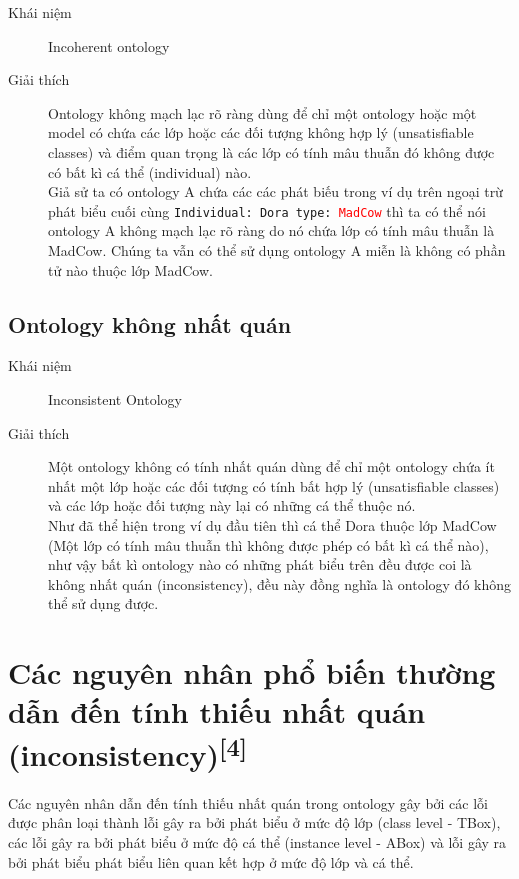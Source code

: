 \begin{description}

\item[Khái niệm] Incoherent ontology

\item[Giải thích]
Ontology không mạch lạc rõ ràng dùng để chỉ một ontology hoặc một model có chứa các lớp hoặc các đối tượng không hợp lý (unsatisfiable classes) và điểm quan trọng là các lớp có tính mâu thuẫn đó không được có bất kì cá thể (individual) nào.
\\
Giả sử ta có ontology A chứa các các phát biếu trong ví dụ trên ngoại trừ phát biểu cuối cùng \texttt{Individual: Dora type: \textcolor{red}{MadCow}} thì ta có thể nói ontology A không mạch lạc rõ ràng do nó chứa lớp có tính mâu thuẫn là MadCow. Chúng ta vẫn có thể sử dụng ontology A miễn là không có phần tử nào thuộc lớp MadCow.
\end{description}

\subsection{Ontology không nhất quán}
\begin{description}
\item[Khái niệm] Inconsistent Ontology
\item[Giải thích] 
Một ontology không có tính nhất quán dùng để chỉ một ontology chứa ít nhất một lớp hoặc các đối tượng có tính bất hợp lý (unsatisfiable classes) và các lớp hoặc đối tượng này lại có những cá thể thuộc nó.
\\
Như đã thể hiện trong ví dụ đầu tiên thì cá thể Dora thuộc lớp MadCow (Một lớp có tính mâu thuẫn thì không được phép có bất kì cá thể nào), như vậy bất kì ontology nào có những phát biểu trên đều được coi là không nhất quán (inconsistency), đều này đồng nghĩa là ontology đó không thể sử dụng được.
\end{description}

\section{Các nguyên nhân phổ biến thường  dẫn đến tính thiếu nhất quán (inconsistency)\textsuperscript{[4]}}
	Các nguyên nhân dẫn đến tính thiếu nhất quán trong ontology gây bởi các lỗi được phân loại thành lỗi gây ra bởi phát biểu ở mức độ lớp (class level - TBox), các lỗi gây ra bởi phát biểu ở mức độ cá thể (instance level - ABox) và lỗi gây ra bởi phát biểu phát biểu liên quan  kết hợp ở mức độ lớp và cá thể.
